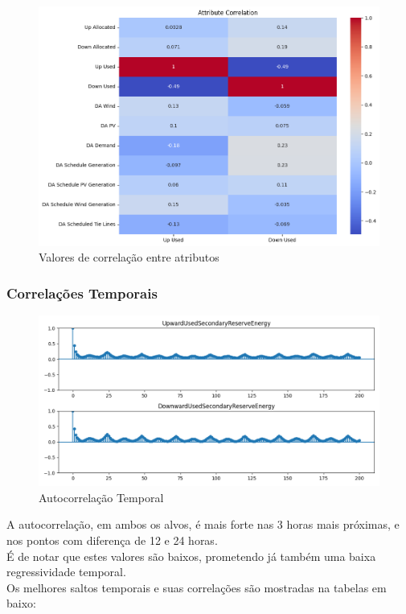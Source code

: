 \begin{figure}[H]
  \centering
  \includegraphics[width=\textwidth]{plots/correlation_heatmap.png}
  \caption{Valores de correlação entre atributos}
  \label{fig:correlationheatmap}
\end{figure}

\subsubsection{Correlações Temporais}

\begin{figure}[H]
  \centering
  \includegraphics[width=\textwidth]{plots/autocorrelation.png}
  \caption{Autocorrelação Temporal}
  \label{fig:autocorrelation}
\end{figure}

A autocorrelação, em ambos os alvos, é mais forte nas 3 horas mais próximas, e nos pontos com diferença de 12 e 24 horas. \\
É de notar que estes valores são baixos, prometendo já também uma baixa regressividade temporal. \\
Os melhores saltos temporais e suas correlações são mostradas na tabelas em baixo:\\



